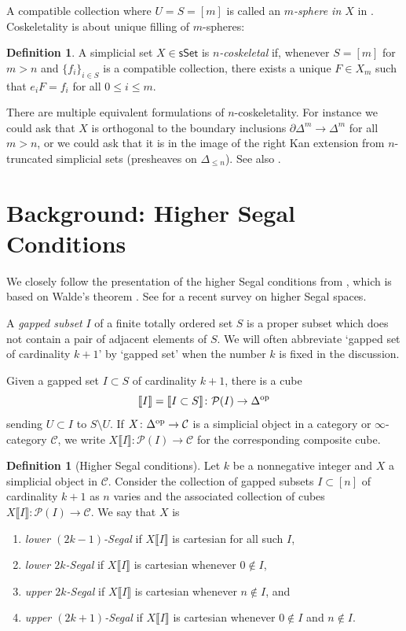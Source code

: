 \documentclass{amsart}
\newcommand{\cube}[1]{\llbracket #1 \rrbracket}
\newcommand{\ps}{\mathcal{P}}
\newcommand{\op}{\textup{op}}
\newcommand{\sset}{\mathsf{sSet}}
\theoremstyle{definition}
\newtheorem{definition}[theorem]{Definition}
\theoremstyle{remark}
\begin{document}
A compatible collection where $U=S=[m]$ is called an \emph{$m$-sphere in $X$} in \cite[Definition 3.2]{KRRZ:LTSS}.
Coskeletality is about unique filling of $m$-spheres: 

\begin{definition}\label{def n-coskel}
A simplicial set $X\in \sset$ is \emph{$n$-coskeletal} if, whenever $S = [m]$ for $m > n$ and $\{ f_i \}_{i\in S}$ is a compatible collection, there exists a unique $F \in X_m$ such that $e_i F = f_i$ for all $0\leq i \leq m$.
\end{definition}

There are multiple equivalent formulations of $n$-coskeletality. 
For instance we could ask that $X$ is orthogonal to the boundary inclusions $\partial \Delta^m \to \Delta^m$ for all $m > n$, or we could ask that it is in the image of the right Kan extension from $n$-truncated simplicial sets (presheaves on $\Delta_{\leq n}$).
See also \cite[\href{https://kerodon.net/tag/051Z}{Tag 051Z}]{kerodon}.


\section{Background: Higher Segal Conditions}

We closely follow the presentation of the higher Segal conditions from \cite{HackneyLynd:HSSPG}, which is based on Walde's theorem \cite{Walde:HSSHE}.
See \cite{Dyckerhoff:CPOC} for a recent survey on higher Segal spaces.

A \emph{gapped subset} $I$ of a finite totally ordered set $S$ is a proper subset which does not contain a pair of adjacent elements of $S$.
We will often abbreviate `gapped set of cardinality $k+1$' by `gapped set' when the number $k$ is fixed in the discussion.

Given a gapped set $I\subset S$ of cardinality $k+1$, there is a cube
\[
	\cube{I} = \cube{I\subset S} \colon \ps(I) \to \Delta^\op
\]
sending $U \subset I$ to $S\setminus U$.
If $X \colon \Delta^\op \to \mathcal{C}$ is a simplicial object in a category or $\infty$-category $\mathcal{C}$, we write $X\cube{I} \colon \ps(I) \to \mathcal{C}$ for the corresponding composite cube.

\begin{definition}[Higher Segal conditions]\label{def higher Segal}
Let $k$ be a nonnegative integer and $X$ a simplicial object in $\mathcal{C}$.
Consider the collection of gapped subsets $I \subset [n]$ of cardinality $k+1$ as $n$ varies and the associated collection of cubes $X\cube{I} \colon \ps(I) \to \mathcal{C}$.
We say that $X$ is
\begin{enumerate}
\item \emph{lower $(2k{-}1)$-Segal} if $X\cube{I}$ is cartesian for all such $I$,
\item \emph{lower $2k$-Segal} if $X\cube{I}$ is cartesian whenever $0 \notin I$,
\item \emph{upper $2k$-Segal} if $X\cube{I}$ is cartesian whenever $n \notin I$, and
\item \emph{upper $(2k{+}1)$-Segal} if $X\cube{I}$ is cartesian whenever $0 \notin I$ and $n \notin I$.
\end{enumerate}
\end{definition}
\end{document}

